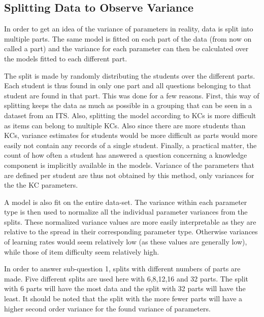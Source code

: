 \documentclass{scrartcl}
\begin{document}
\subsection{Splitting Data to Observe Variance}
\label{sec:splits}
In order to get an idea of the variance of parameters in reality, data is split into multiple parts. The same model is fitted on each part of the data (from now on called a part) and the variance for each parameter can then be calculated over the models fitted to each different part. 

The split is made by randomly distributing the students over the different parts. Each student is thus found in only one part and all questions belonging to that student are found in that part. This was done for a few reasons. First, this way of splitting keeps the data as much as possible in a grouping that can be seen in a dataset from an ITS.  Also, splitting the model according to KCs is more difficult as items can belong to multiple KCs. Also since there are more students than KCs, variance estimates for students would be more difficult as parts would more easily not contain any records of a single student. Finally, a practical matter, the count of how often a student has answered a question concerning a knowledge component is implicitly available in the models. Variance of the parameters that are defined per student are thus not obtained by this method, only variances for the the KC parameters.

A model is also fit on the entire data-set. The variance within each parameter type is then used to normalize all the individual parameter variances from the splits. These normalized variance values are more easily interpretable as they are relative to the spread in their corresponding parameter type. Otherwise variances of learning rates would seem relatively low (as these values are generally low), while those of item difficulty seem relatively high.

In order to answer sub-question 1, splits with different numbers of parts are made. Five different splits are used here with 6,8,12,16 and 32 parts. The split with 6 parts will have the most data and the split with 32 parts will have the least. It should be noted that the split with the more fewer parts will have a higher second order variance for the found variance of parameters.
\end{document}
